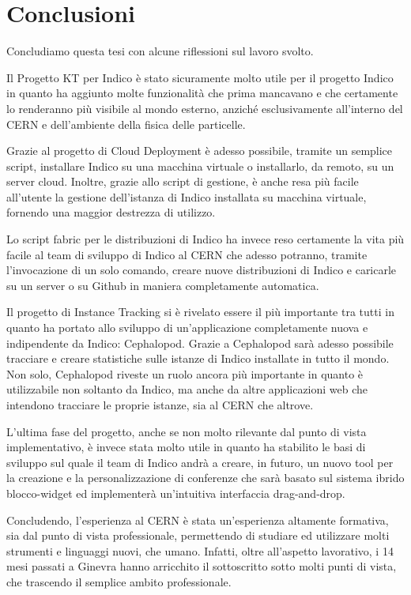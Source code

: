 \chapter{Conclusioni} \label{chap:conclusioni}

    Concludiamo questa tesi con alcune riflessioni sul lavoro svolto.
    
    Il Progetto KT per Indico è stato sicuramente molto utile per il progetto Indico in quanto ha aggiunto molte funzionalità che prima mancavano e che certamente lo renderanno più visibile al mondo esterno, anziché esclusivamente all'interno del \ac{CERN} e dell'ambiente della fisica delle particelle.
    
    Grazie al progetto di Cloud Deployment è adesso possibile, tramite un semplice script, installare Indico su una macchina virtuale o installarlo, da remoto, su un server cloud. Inoltre, grazie allo script di gestione, è anche resa più facile all'utente la gestione dell'istanza di Indico installata su macchina virtuale, fornendo una maggior destrezza di utilizzo.
    
    Lo script fabric per le distribuzioni di Indico ha invece reso certamente la vita più facile al team di sviluppo di Indico al \ac{CERN} che adesso potranno, tramite l'invocazione di un solo comando, creare nuove distribuzioni di Indico e caricarle su un server o su Github in maniera completamente automatica.
    
    Il progetto di Instance Tracking si è rivelato essere il più importante tra tutti in quanto ha portato allo sviluppo di un'applicazione completamente nuova e indipendente da Indico: Cephalopod. Grazie a Cephalopod sarà adesso possibile tracciare e creare statistiche sulle istanze di Indico installate in tutto il mondo. Non solo, Cephalopod riveste un ruolo ancora più importante in quanto è utilizzabile non soltanto da Indico, ma anche da altre applicazioni web che intendono tracciare le proprie istanze, sia al \ac{CERN} che altrove.
    
    L'ultima fase del progetto, anche se non molto rilevante dal punto di vista implementativo, è invece stata molto utile in quanto ha stabilito le basi di sviluppo sul quale il team di Indico andrà a creare, in futuro, un nuovo tool per la creazione e la personalizzazione di conferenze che sarà basato sul sistema ibrido blocco-widget ed implementerà un'intuitiva interfaccia drag-and-drop.
    
    Concludendo, l'esperienza al \ac{CERN} è stata un'esperienza altamente formativa, sia dal punto di vista professionale, permettendo di studiare ed utilizzare molti strumenti e linguaggi nuovi, che umano. Infatti, oltre all'aspetto lavorativo, i 14 mesi passati a Ginevra hanno arricchito il sottoscritto sotto molti punti di vista, che trascendo il semplice ambito professionale.
